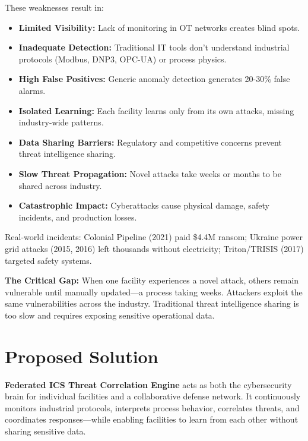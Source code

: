 \documentclass[12pt,a4paper]{article}
\begin{document}
These weaknesses result in:
\begin{itemize}[leftmargin=1cm,itemsep=0pt]
    \item \textbf{Limited Visibility:} Lack of monitoring in OT networks creates blind spots.
    \item \textbf{Inadequate Detection:} Traditional IT tools don't understand industrial protocols (Modbus, DNP3, OPC-UA) or process physics.
    \item \textbf{High False Positives:} Generic anomaly detection generates 20-30\% false alarms.
    \item \textbf{Isolated Learning:} Each facility learns only from its own attacks, missing industry-wide patterns.
    \item \textbf{Data Sharing Barriers:} Regulatory and competitive concerns prevent threat intelligence sharing.
    \item \textbf{Slow Threat Propagation:} Novel attacks take weeks or months to be shared across industry.
    \item \textbf{Catastrophic Impact:} Cyberattacks cause physical damage, safety incidents, and production losses.
\end{itemize}

Real-world incidents: Colonial Pipeline (2021) paid \$4.4M ransom; Ukraine power grid attacks (2015, 2016) left thousands without electricity; Triton/TRISIS (2017) targeted safety systems.

\textbf{The Critical Gap:} When one facility experiences a novel attack, others remain vulnerable until manually updated—a process taking weeks. Attackers exploit the same vulnerabilities across the industry. Traditional threat intelligence sharing is too slow and requires exposing sensitive operational data.

\section{Proposed Solution}
\textbf{Federated ICS Threat Correlation Engine} acts as both the cybersecurity brain for individual facilities and a collaborative defense network.
It continuously monitors industrial protocols, interprets process behavior, correlates threats, and coordinates responses—while enabling facilities to learn from each other without sharing sensitive data.
\end{document}

